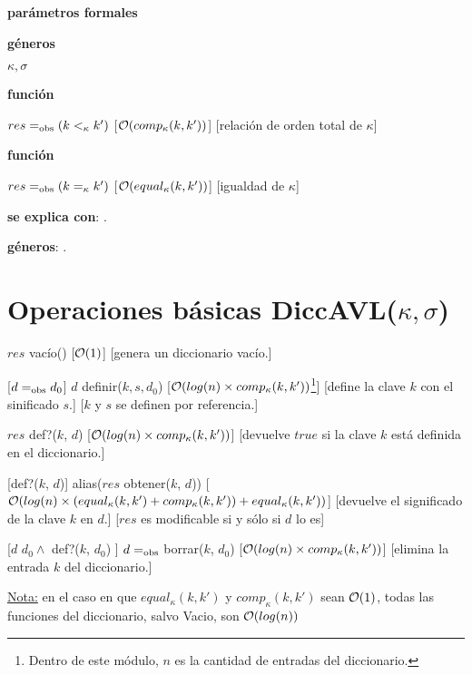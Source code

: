 \begin{Interfaz}
  \textbf{parámetros formales}\parindent\\
  \parbox{1.7cm}{\textbf{géneros}} $\kappa, \sigma$\\
  \parbox[t]{1.7cm}{\textbf{función}}\parbox[t]{\textwidth-2\parindent-1.7cm}{    	
    {$res =_{\mathrm{obs}} (k <_{\kappa} k')$}
    [$\mathcal{O}(comp_{\kappa}(k, k'))$]
    [relación de orden total de $\kappa$]
    }
        
   \parbox[t]{1.7cm}{\textbf{función}}\parbox[t]{\textwidth-2\parindent-1.7cm}{    	
    {$res =_{\mathrm{obs}} (k =_{\kappa} k')$}
    [$\mathcal{O}(equal_{\kappa}(k, k'))$]
    [igualdad de $\kappa$]
    }
    
  \textbf{se explica con}: .

  \textbf{géneros}: .

  \section*{Operaciones básicas DiccAVL($\kappa, \sigma$)}

  {$res$ \igobs vacío()}
  [$\mathcal{O}(1)$]
  [genera un diccionario vacío.]

  [$d =_{\mathrm{obs}} d_0$]  
  {$d$ \igobs definir($k, s, d_0$)}
  [$\mathcal{O}(log(n) \times comp_{\kappa}(k, k'))$\footnote{Dentro de este módulo, $n$ es la cantidad de entradas del diccionario.}]
  [define la clave $k$ con el sinificado $s$.]
  [$k$ y $s$ se definen por referencia.]
    
  {$res$ \igobs def?($k$, $d$) }
  [$\mathcal{O}(log(n) \times comp_{\kappa}(k, k'))$]
  [devuelve $true$ si la clave $k$ está definida en el diccionario.]
  
  [def?($k$, $d$)]  
  {alias($res$ \igobs obtener($k$, $d$))}
  [$\mathcal{O}(log(n) \times (equal_{\kappa}(k, k') + comp_{\kappa}(k, k')) + equal_{\kappa}(k, k'))$]
  [devuelve el significado de la clave $k$ en $d$.]
  [$res$ es modificable si y sólo si $d$ lo es]
  
  [$d$ \igobs $d_0 \land$ def?($k$, $d_0$) ]
  {$d =_{\mathrm{obs}}$ borrar($k$, $d_0$)}
  [$\mathcal{O}(log(n) \times comp_{\kappa}(k, k'))$]
  [elimina la entrada $k$ del diccionario.] 
  
  \underline{Nota:} en el caso en que $equal_{\kappa}(k, k')$ y $comp_{\kappa}(k, k')$ sean $\mathcal{O}(1)$, todas las funciones del diccionario, salvo Vacio, son $\mathcal{O}(log(n))$
  \clearpage
\end{Interfaz}

